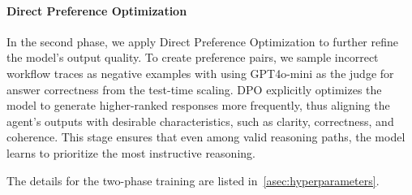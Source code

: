 \paragraph{Direct Preference Optimization} 
In the second phase, we apply Direct Preference Optimization to further refine the model’s output quality. 
To create preference pairs, we sample incorrect workflow traces as negative examples with using GPT4o-mini as the judge for answer correctness from the test-time scaling. 
DPO explicitly optimizes the model to generate higher-ranked responses more frequently, thus aligning the agent’s outputs with desirable characteristics, such as clarity, correctness, and coherence. This stage ensures that even among valid reasoning paths, the model learns to prioritize the most instructive reasoning.

The details for the two-phase training are listed in~\cref{asec:hyperparameters}.
